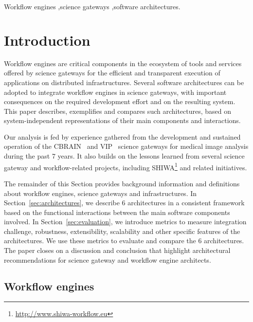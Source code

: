 \documentclass[preprint,3p,twocolumn]{elsarticle}
\begin{document}
\begin{frontmatter}
\begin{keyword}
Workflow engines \sep science gateways \sep software architectures.
\end{keyword}

\end{frontmatter}


\section{Introduction}

Workflow engines are critical components in the ecosystem of tools and
services offered by science gateways for the efficient and transparent
execution of applications on distributed infrastructures. Several
software architectures can be adopted to integrate workflow engines in
science gateways, with important consequences on the required
development effort and on the resulting system. This paper describes,
exemplifies and compares such architectures, based on
system-independent representations of their main components and
interactions.

Our analysis is fed by experience gathered from the development and
sustained operation of the CBRAIN~\cite{SHER-14} and
VIP~\cite{GLAT-13} science gateways for medical image analysis during
the past 7 years. It also builds on the lessons learned from several
science gateway and workflow-related projects, including
SHIWA\footnote{\url{http://www.shiwa-workflow.eu}} and related
initiatives.

The remainder of this Section provides background information and
definitions about workflow engines, science gateways and
infrastructures. In Section~\ref{sec:architectures}, we describe 6
architectures in a consistent framework based on the functional
interactions between the main software components involved. In
Section~\ref{sec:evaluation}, we introduce metrics to measure
integration challenge, robustness, extensibility, scalability and other
specific features of the architectures. We use these metrics to
evaluate and compare the 6 architectures. The paper closes on a
discussion and conclusion that highlight architectural recommendations
for science gateway and workflow engine architects.

\subsection{Workflow engines}
\end{document}
